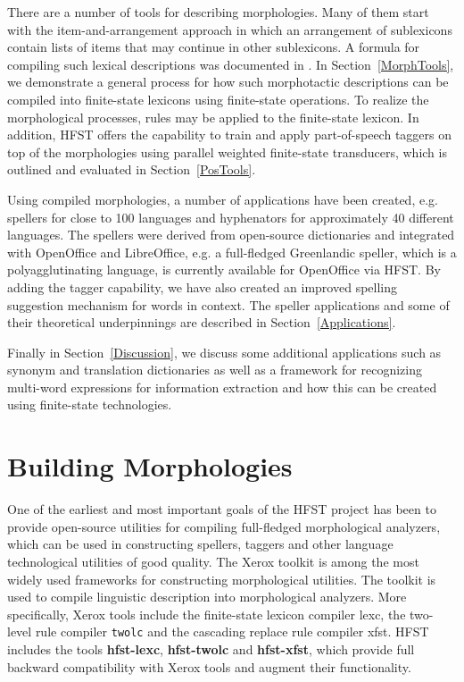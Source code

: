 \documentclass{llncs}
\begin{document}
There are a number of tools for describing morphologies. Many of them 
start with the item-and-arrangement approach in which an arrangement of 
sublexicons contain lists of items that may continue in other sublexicons. A formula
for compiling such lexical descriptions was documented in \cite{linden/2009/sfcm}.
In Section~\ref{MorphTools}, we demonstrate a general process for how such morphotactic descriptions 
can be compiled into finite-state lexicons using finite-state operations. 
To realize the morphological processes, rules may be applied to the finite-state lexicon. 
In addition, HFST offers the capability to train and apply part-of-speech
taggers on top of the morphologies using parallel weighted finite-state transducers, 
which is outlined and evaluated in Section~\ref{PosTools}.

Using compiled morphologies, a number of applications
have been created, e.g. spellers for close to 100 languages and
hyphenators for approximately 40 different languages. The spellers were
derived from open-source dictionaries and integrated with OpenOffice and
LibreOffice, e.g. a full-fledged Greenlandic speller, which is a
polyagglutinating language, is currently available for OpenOffice via HFST. 
By adding the tagger capability, we have also created an
improved spelling suggestion mechanism for words in context.
The speller applications and some of their theoretical underpinnings are described 
in Section~\ref{Applications}.

Finally  in Section~\ref{Discussion}, we discuss some additional applications such as synonym and translation dictionaries 
as well as a framework for recognizing multi-word expressions for information extraction and how this can be created 
using finite-state technologies.

\section{Building Morphologies}\label{LexiconTools}



One of the earliest and most important goals of the HFST project has
been to provide open-source utilities for compiling full-fledged
morphological analyzers, which can be used in constructing spellers,
taggers and other language technological utilities of good
quality. The Xerox toolkit \cite{beesley/2003} is among the most
widely used frameworks for constructing morphological utilities. The
toolkit is used to compile linguistic description into morphological
analyzers. More specifically, Xerox tools include the finite-state
lexicon compiler lexc, the two-level rule compiler \verb|twolc| and the
cascading replace rule compiler xfst. HFST includes the tools
\textbf{hfst-lexc}, \textbf{hfst-twolc} and \textbf{hfst-xfst}, which provide full backward
compatibility with Xerox tools and augment their functionality.
\end{document}
